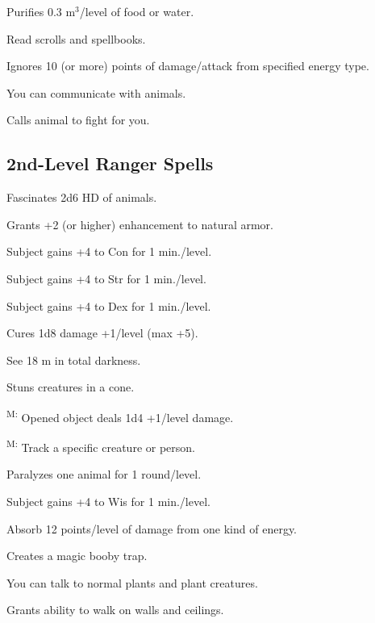  Purifies 0.3 m$^3$/level of food or water.

 Read scrolls and spellbooks.

 Ignores 10 (or more) points of damage/attack from specified energy type.

 You can communicate with animals.

 Calls animal to fight for you.



\subsection{2nd-Level Ranger Spells}

 Fascinates 2d6 HD of animals.

 Grants +2 (or higher) enhancement to natural armor.

 Subject gains +4 to Con for 1 min./level.

 Subject gains +4 to Str for 1 min./level.

 Subject gains +4 to Dex for 1 min./level.

 Cures 1d8 damage +1/level (max +5).

 See 18 m in total darkness.

 Stuns creatures in a cone. %

\textsuperscript{M:} Opened object deals 1d4 +1/level damage.

\textsuperscript{M:} Track a specific creature or person. %

 Paralyzes one animal for 1 round/level.

 Subject gains +4 to Wis for 1 min./level.

 Absorb 12 points/level of damage from one kind of energy.

 Creates a magic booby trap.

 You can talk to normal plants and plant creatures.

 Grants ability to walk on walls and ceilings.

